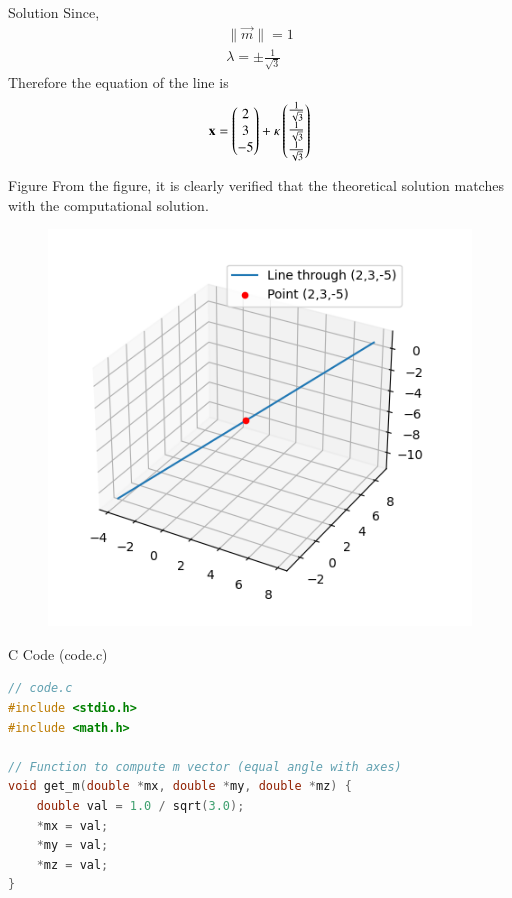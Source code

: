 \documentclass{beamer}
\begin{document}
\begin{frame}{Solution}
Since,
\begin{align}
    \big\lVert \vec{m} \big\rVert = 1\\
    \lambda = \pm\frac{1}{\sqrt{3}}
\end{align}
Therefore the equation of the line is
\begin{align}
    \mathbf{x} = \begin{pmatrix}2 \\ 3 \\ -5\end{pmatrix} + \kappa\begin{pmatrix}\tfrac{1}{\sqrt{3}} \\ \tfrac{1}{\sqrt{3}} \\ \tfrac{1}{\sqrt{3}}\end{pmatrix} 
\end{align}
\end{frame}

\begin{frame}{Figure}
From the figure, it is clearly verified that the theoretical solution matches with the computational solution.
\begin{figure}[h!]
    \centering
    \includegraphics[height=0.5\textheight, keepaspectratio]{figs/fig.png}
\end{figure}
\end{frame}


\begin{frame}[fragile]{C Code (code.c)}
\begin{lstlisting}[language=C]
// code.c
#include <stdio.h>
#include <math.h>

// Function to compute m vector (equal angle with axes)
void get_m(double *mx, double *my, double *mz) {
    double val = 1.0 / sqrt(3.0);
    *mx = val;
    *my = val;
    *mz = val;
}
\end{lstlisting}
\end{frame}
\end{document}
